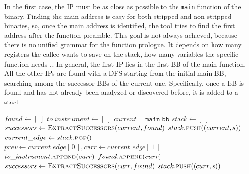 In the first case, the \gls{IP} must be as close as possible to the \texttt{main} function of the binary.
Finding the main address is easy for both stripped and non-stripped binaries, so, once the main address is identified, 
the tool tries to find the first address after the function preamble.
This goal is not always achieved, because there is no unified grammar for the function prologue. 
It depends on how many registers the callee wants to save on the stack, how many variables the specific function needs \dots
In general, the first \gls{IP} lies in the first \gls{BB} of the main function.\\
All the other \gls{IP}s are found with a \gls{DFS} starting from the initial main \gls{BB}, searching among the 
successor \gls{BB}s of the current one.
Specifically, once a \gls{BB} is found and has not already been analyzed or discovered before, it is added to a stack.
\begin{algorithm}[ht]
    \caption{Instrumentation point search with DFS algorithm}
    \label{alg:ip_search_dfs}
    \begin{algorithmic}[1]
        \STATE $found \gets[\,\,]$ \COMMENT {\small \textcolor{green!60!black}{found is a list of discovered basic blocks. It contains both the basic blocks to be instrumented and the basic blocks for which instrumentation is not required}}
        \STATE $to\_instrument\gets[\,\,]$ \COMMENT{\small \textcolor{green!60!black}{this is the list of basic blocks to be instrumented. It is a subset of the ``found'' list}}
        \STATE $current=\texttt{main\_bb}$
        \STATE $stack\gets[\,\,]$
        \STATE $successors\gets \textsc{ExtractSuccessors}(current,found)$
            \STATE $stack.\textsc{push}((current,s))$
        \ENDFOR
            \STATE $current\_edge\gets stack.\textsc{pop}()$
            \STATE $prev \gets current\_edge[\,0\,] , curr \gets current\_edge[\,1\,]$
                \STATE $to\_instrument.\textsc{append}(curr)$  \COMMENT{\small \textcolor{green!60!black}{If the previous basic block ends with a call instruction, the current basic block will not be instrumented}}
            \ENDIF 
            \STATE $found.\textsc{append}(curr)$
            \STATE $successors\gets \textsc{ExtractSuccessors}(curr,found)$
                \STATE $stack.\textsc{push}((curr,s))$ 
            \ENDFOR
        \ENDWHILE
    \end{algorithmic}
\end{algorithm}
